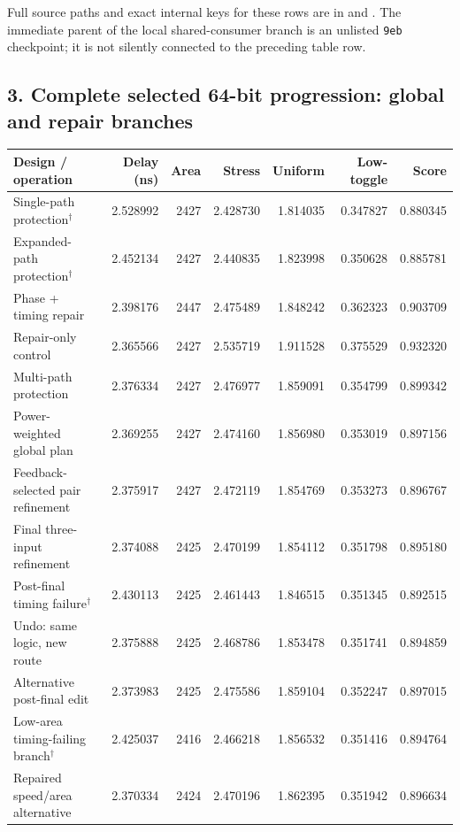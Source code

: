 \documentclass[10pt]{article}
\newcommand{\sect}[1]{\subsection*{#1}}
\begin{document}
Full source paths and exact internal keys for these rows are in  and . The immediate parent of the local shared-consumer branch is an unlisted \texttt{9eb} checkpoint; it is not silently connected to the preceding table row.

\newpage
\sect{3. Complete selected 64-bit progression: global and repair branches}
\begin{center}\fontsize{8.4}{10.1}\selectfont\setlength{\tabcolsep}{3.6pt}
\begin{tabular}{@{}>{\raggedright\arraybackslash}p{5.3cm}rrrrrr@{}}\toprule
Design / operation & Delay (ns) & Area & Stress & Uniform & Low-toggle & Score\\\midrule
Single-path protection$^{\dagger}$ & 2.528992 & 2427 & 2.428730 & 1.814035 & 0.347827 & 0.880345\\
Expanded-path protection$^{\dagger}$ & 2.452134 & 2427 & 2.440835 & 1.823998 & 0.350628 & 0.885781\\
Phase + timing repair & 2.398176 & 2447 & 2.475489 & 1.848242 & 0.362323 & 0.903709\\
Repair-only control & 2.365566 & 2427 & 2.535719 & 1.911528 & 0.375529 & 0.932320\\
Multi-path protection & 2.376334 & 2427 & 2.476977 & 1.859091 & 0.354799 & 0.899342\\
Power-weighted global plan & 2.369255 & 2427 & 2.474160 & 1.856980 & 0.353019 & 0.897156\\
Feedback-selected pair refinement & 2.375917 & 2427 & 2.472119 & 1.854769 & 0.353273 & 0.896767\\
Final three-input refinement & 2.374088 & 2425 & 2.470199 & 1.854112 & 0.351798 & 0.895180\\
Post-final timing failure$^{\dagger}$ & 2.430113 & 2425 & 2.461443 & 1.846515 & 0.351345 & 0.892515\\
Undo: same logic, new route & 2.375888 & 2425 & 2.468786 & 1.853478 & 0.351741 & 0.894859\\
Alternative post-final edit & 2.373983 & 2425 & 2.475586 & 1.859104 & 0.352247 & 0.897015\\
Low-area timing-failing branch$^{\dagger}$ & 2.425037 & 2416 & 2.466218 & 1.856532 & 0.351416 & 0.894764\\
Repaired speed/area alternative & 2.370334 & 2424 & 2.470196 & 1.862395 & 0.351942 & 0.896634\\
\bottomrule\end{tabular}\end{center}
\end{document}
